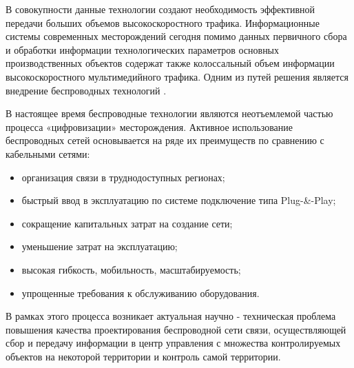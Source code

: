 В совокупности данные технологии создают необходимость эффективной передачи больших объемов высокоскоростного трафика. Информационные  системы современных месторождений сегодня помимо данных первичного сбора и обработки информации технологических параметров основных производственных объектов содержат также колоссальный объем информации высокоскоростного мультимедийного трафика. Одним из путей решения является внедрение беспроводных технологий \cite{Dmitrievskiy2020}.

В настоящее время беспроводные технологии являются неотъемлемой частью процесса «цифровизации» месторождения. Активное использование беспроводных сетей основывается на ряде их преимуществ по сравнению с кабельными сетями:
\begin{itemize}
    \item организация связи в труднодоступных регионах;
    \item быстрый ввод в эксплуатацию по системе подключение типа Plug-\&-Play;
    \item сокращение капитальных затрат на создание сети; 
    \item уменьшение затрат на эксплуатацию;
    \item высокая гибкость, мобильность, масштабируемость;
    \item упрощенные требования к обслуживанию оборудования.
\end{itemize}

В рамках этого процесса возникает актуальная научно - техническая проблема повышения качества проектирования беспроводной сети связи, осуществляющей сбор и передачу информации в центр  управления с множества контролируемых объектов на некоторой территории и контроль самой территории.   





